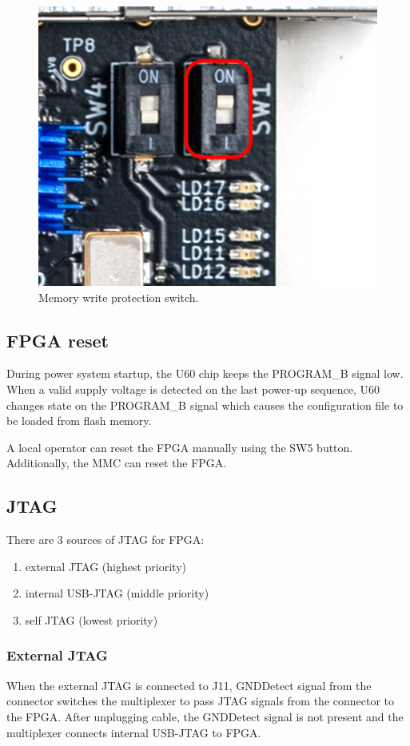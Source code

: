 \documentclass[12pt,oneside,a4]{article}
\begin{document}
\begin{figure}[H]
\begin{center}
\includegraphics[width=0.5\linewidth]{bootsw.png}
 \caption{Memory write protection switch.}\label{fig:bootsw}
\end{center}
\end{figure}

\subsection{FPGA reset}
During power system startup, the U60 chip keeps the PROGRAM\_B signal low. When a valid supply voltage is detected on the last power-up sequence, U60 changes state on the PROGRAM\_B signal which causes the configuration file to be loaded from flash memory.

A local operator can reset the FPGA manually using the SW5 button. Additionally, the MMC can reset the FPGA.

\subsection{JTAG}
There are 3 sources of JTAG for FPGA:
\begin{enumerate}
	\item external JTAG (highest priority)
	\item internal USB-JTAG (middle priority)
	\item self JTAG (lowest priority)
\end{enumerate}

\subsubsection{External JTAG}
When the external JTAG is connected to J11, GNDDetect signal from the connector switches the multiplexer to pass JTAG signals from the connector to the FPGA.  After unplugging cable, the GNDDetect signal is not present and the multiplexer connects internal USB-JTAG to FPGA.
\end{document}
